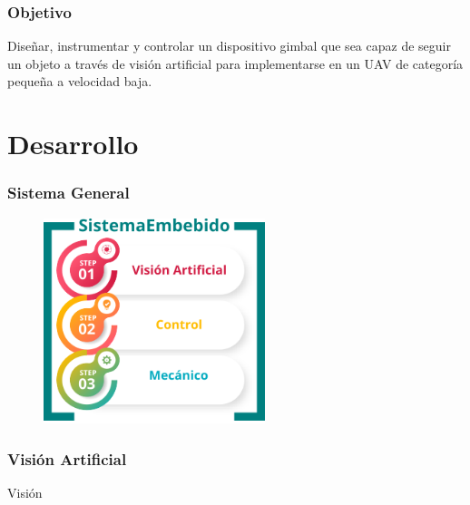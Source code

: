 \documentclass[11pt]{beamer}
\begin{document}
  \begin{frame}
    \frametitle{Objetivo}
    Diseñar, instrumentar y controlar un dispositivo gimbal que sea capaz de
    seguir un objeto a través de visión artificial para implementarse en un UAV
    de categoría pequeña a velocidad baja.
  \end{frame}

  \section{Desarrollo}
  \begin{frame}
    \frametitle{Sistema General}
    \begin{figure}[h]
      \includegraphics[height=6cm, keepaspectratio]{images/sistemas.png}
    \end{figure}
  \end{frame}
  \begin{frame}
    \frametitle{Visión Artificial} 
    \begin{algorithm}[H]
      \begin{algorithmic}[1]
      \end{algorithmic}
      \caption{Visión}
      \label{alg:seq}
      \end{algorithm}
  \end{frame}
\end{document}
